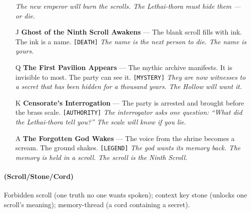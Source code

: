\begin{enumerate}
  \hfill \textit{The new emperor will burn the scrolls. The Lethai-thora must hide them --- or die.}
\item[J] \textbf{Ghost of the Ninth Scroll Awakens} --- The blank scroll fills with ink. The ink is a name. \texttt{[DEATH]}
  \hfill \textit{The name is the next person to die. The name is yours.}
\item[Q] \textbf{The First Pavilion Appears} --- The mythic archive manifests. It is invisible to most. The party can see it. \texttt{[MYSTERY]}
  \hfill \textit{They are now witnesses to a secret that has been hidden for a thousand years. The Hollow will want it.}
\item[K] \textbf{Censorate's Interrogation} --- The party is arrested and brought before the brass scale. \texttt{[AUTHORITY]}
  \hfill \textit{The interrogator asks one question: ``What did the Lethai-thora tell you?'' The scale will know if you lie.}
\item[A] \textbf{The Forgotten God Wakes} --- The voice from the shrine becomes a scream. The ground shakes. \texttt{[LEGEND]}
  \hfill \textit{The god wants its memory back. The memory is held in a scroll. The scroll is the Ninth Scroll.}
\end{enumerate}

\paragraph*{(Scroll/Stone/Cord)} Forbidden scroll (one truth no one wants spoken); context key stone (unlocks one scroll's meaning); memory-thread (a cord containing a secret).

